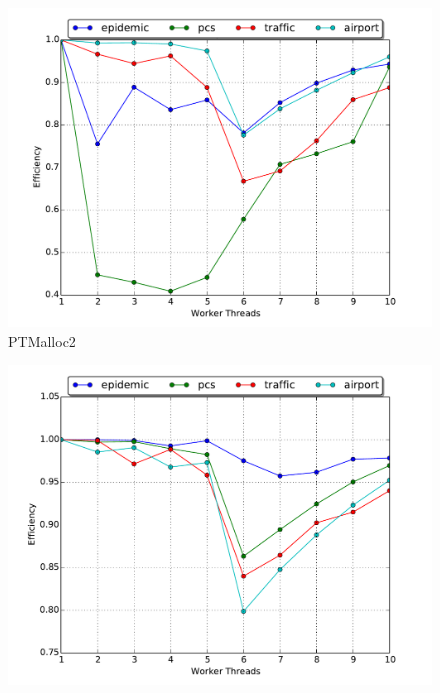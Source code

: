 \documentclass[11pt]{book}
\begin{document}
\begin{figure}
  \begin{minipage}{.5\textwidth}
    \begin{center}
      \includegraphics[width=\textwidth,keepaspectratio,quiet]{figs/memory_allocation/ptmalloc_efficiency.pdf} \\
      PTMalloc2 \\
    \end{center}
  \end{minipage}%
  \hfill
  \begin{minipage}{.5\textwidth}
    \begin{center}
      \includegraphics[width=\textwidth,keepaspectratio,quiet]{figs/memory_allocation/tcmalloc_efficiency.pdf} \\

\end{center}
\end{minipage}
\end{figure}
\end{document}

